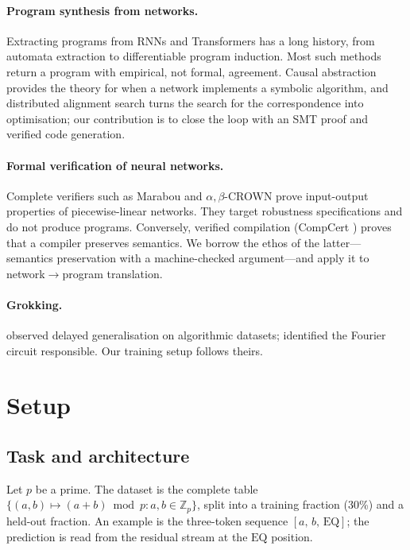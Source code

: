 \documentclass[11pt]{article}
\newcommand{\Zp}{\mathbb{Z}_p}
\begin{document}
\paragraph{Program synthesis from networks.}
Extracting programs from RNNs and Transformers has a long history, from
automata extraction \citep{weiss2018extracting} to differentiable program
induction. Most such methods return a program with empirical, not formal,
agreement. Causal abstraction \citep{geiger2023causal} provides the theory for when a
network implements a symbolic algorithm, and distributed alignment search
\citep{geiger2024das} turns the search for the correspondence into optimisation;
our contribution is to close the loop with an SMT proof and verified code
generation.

\paragraph{Formal verification of neural networks.}
Complete verifiers such as Marabou \citep{katz2019marabou} and $\alpha,\beta$-CROWN
\citep{zhang2018crown} prove input-output properties of piecewise-linear networks.
They target robustness specifications and do not produce programs. Conversely,
verified compilation (CompCert \citep{leroy2009compcert}) proves that a compiler
preserves semantics. We borrow the ethos of the latter---semantics preservation
with a machine-checked argument---and apply it to network$\to$program translation.

\paragraph{Grokking.}
\citet{power2022grokking} observed delayed generalisation on algorithmic
datasets; \citet{nanda2023grokking} identified the Fourier circuit responsible.
Our training setup follows theirs.

\section{Setup}
\label{sec:setup}

\subsection{Task and architecture}

Let $p$ be a prime. The dataset is the complete table
$\{(a,b)\mapsto (a+b)\bmod p : a,b\in\Zp\}$, split into a training fraction
(30\%) and a held-out fraction. An example is the three-token sequence
$[a,\,b,\,\mathrm{EQ}]$; the prediction is read from the residual stream at the
$\mathrm{EQ}$ position.
\end{document}
